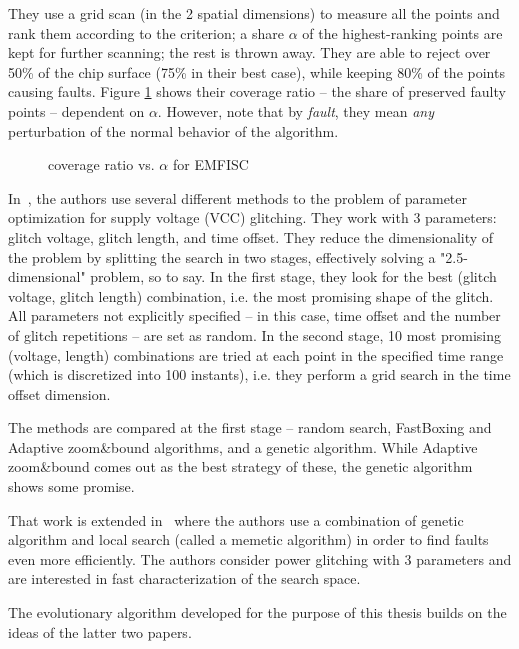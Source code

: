 \documentclass[times, utf8, diplomski]{fer}
\begin{document}
They use a grid scan (in the 2 spatial dimensions) to measure all the points
and rank them according to the criterion; a share $\alpha$ of the highest-ranking
points are kept for further scanning; the rest is thrown away.
They are able to reject over 50\% of the chip surface (75\% in their best case),
while keeping 80\% of the points causing faults. Figure \ref{fig:emfisc} shows
their coverage ratio -- the share of preserved faulty points -- dependent on $\alpha$.
However, note that by \emph{fault}, they mean \emph{any} perturbation of the
normal behavior of the algorithm.

\begin{figure}[htb]\label{fig:emfisc}
    \centering
    \caption{coverage ratio vs. $\alpha$ for EMFISC}
\end{figure}


In~\cite{GlitchItIfYouCan}, the authors use several different methods to the
problem of parameter optimization for supply voltage (VCC) glitching. They work
with 3 parameters: glitch voltage, glitch length, and time offset. They reduce
the dimensionality of the problem by splitting the search in two stages,
effectively solving a "2.5-dimensional" problem, so to say. In the first stage,
they look for the best (glitch voltage, glitch length) combination, i.e. the
most promising shape of the glitch. All parameters not explicitly specified
 -- in this case, time offset and the number of glitch repetitions -- are
set as random. In the second stage, 10 most promising (voltage, length)
combinations are tried at each point in the specified time range (which is
discretized into 100 instants), i.e. they perform a grid search in the time
offset dimension.

The methods are compared at the first stage -- random search, FastBoxing and
Adaptive zoom\&bound algorithms, and a genetic algorithm. While Adaptive
zoom\&bound comes out as the best strategy of these, the genetic algorithm
shows some promise. 

That work is extended in~\cite{FI_memetic} where the authors use a combination of
genetic algorithm and local search (called a memetic algorithm) in order to find
faults even more efficiently. The authors consider power glitching with 3
parameters and are interested in fast characterization of the search space.


The evolutionary algorithm developed for the purpose of this thesis builds on
the ideas of the latter two papers.
\end{document}
